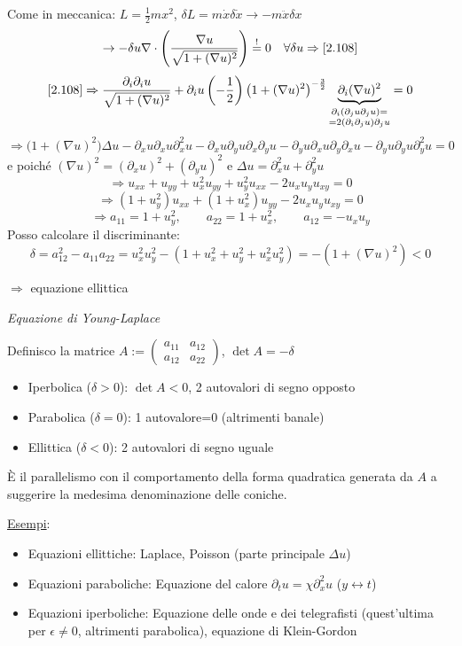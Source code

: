 \documentclass[a4paper,11pt]{report}
\begin{document}
Come in meccanica: $L=\frac{1}{2} m x^2$, $\delta L = m \dot{x} \delta \dot{x} \rightarrow -m \ddot{x} \delta x$
\[
\rightarrow -\delta u \nabla \cdot \left(\frac{\nabla u}{\sqrt{1+(\nabla u)^2}}\right)\overset{!}{=}0 \quad \forall \delta u \Rightarrow \eqref{2.108}
\]
\[
\eqref{2.108} \Rightarrow \frac{\partial_i \partial_i u}{\sqrt{1+(\nabla u)^2}} + \partial_i u \left(-\frac{1}{2}\right) \big(1+(\nabla u)^2\big)^{-\frac{3}{2}} \underbrace{\partial_i (\nabla u)^2}_{ \substack{\partial_i(\partial_j u \partial_j u)= \\ =2(\partial_i\partial_j u)\partial_j u } } =0
\]
\[
\Rightarrow \big(1+ (\nabla u)^2 \big) \Delta u - \partial_x u \partial_x u \partial_x^2 u - \partial_x u\partial_y u \partial_x\partial_y u - \partial_yu \partial_x u \partial_y \partial_x u - \partial_y u\partial_y u \partial_y^2 u =0
\]
e poich\'e $(\nabla u)^2=(\partial_x u)^2 + (\partial_y u)^2$ e $\Delta u =\partial_x^2 u + \partial_y^2 u$
\[
\Rightarrow u_{xx} + u_{yy} + u_x^2 u_{yy} + u_y^2 u_{xx} - 2u_xu_y u_{xy}=0
\]
\begin{equation}
\Rightarrow (1+u_y^2)u_{xx} + (1+u_x^2) u_{yy} - 2u_x u_y u_{xy}=0 
\tag{$\theequation^\prime$}
\label{2.108'}
\end{equation}
\[
\Rightarrow a_{11}=1+u_y^2, \qquad a_{22}=1+u_x^2, \qquad a_{12}=-u_x u_y
\]
Posso calcolare il discriminante:
\[
\delta = a_{12}^2 -a_{11}a_{22} = u_x^2 u_y^2 - (1+u_x^2 + u_y^2 + u_x^2u_y^2)=-(1+(\nabla u)^2) <0
\]
\centerline{$\Rightarrow$ equazione ellittica}
\centerline{\emph{Equazione di Young-Laplace}}

Definisco la matrice $ A:=\left(\begin{matrix}
a_{11} & a_{12}\\
a_{12} & a_{22}
\end{matrix}\right)$, $\det A=-\delta$
\begin{itemize}
\item Iperbolica ($\delta >0$): $\det A<0$, 2 autovalori di segno opposto
\item Parabolica ($\delta =0$): 1 autovalore=0 (altrimenti banale)
\item Ellittica ($\delta <0$): 2 autovalori di segno uguale
\end{itemize}
\`E il parallelismo con il comportamento della forma quadratica generata da $A$ a suggerire la medesima denominazione delle coniche.

\underline{Esempi}:

\begin{itemize}
\item Equazioni ellittiche: Laplace, Poisson (parte principale $\Delta u$)
\item Equazioni paraboliche: Equazione del calore $\partial_t u = \chi \partial_x^2 u$ ($y \leftrightarrow t$)
\item Equazioni iperboliche: Equazione delle onde e dei telegrafisti (quest'ultima per $\epsilon \neq 0$, altrimenti parabolica), equazione di Klein-Gordon
\end{itemize}
\end{document}
